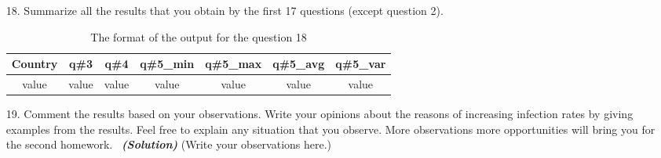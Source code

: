 \documentclass[a4 paper]{article}
\numberwithin{equation}{section}
\newcommand{\solution}{~\newline\textbf{\textit{(Solution)}} }
\newcommand{\0}{\mathbf{0}}
\begin{document}
\begin{itemize}
\begin{table}[ht]
\begin{tabular}{c c c c}
			\hline %
		\end{tabular}\label{table:nonlin}%
	\end{table}
	\item[18. ] Summarize all the results that you obtain by the first 17 questions (except question 2). 
	\begin{table}[ht]
		\caption{The format of the output for the question 18} %
		\centering  %
		\begin{tabular}{c c c c c c c}%
			\hline\hline       %
			Country & q\#3 & q\#4 & q\#5\_min &  q\#5\_max & q\#5\_avg &  q\#5\_var  \\ 
			[0.5ex]%
			\hline      %
			 value & value & value & value & value & value & value\\%

			\hline %
		\end{tabular}\label{table:nonlin}%
	\end{table}
	\item[19. ] Comment the results based on your observations. Write your opinions about the reasons of increasing infection rates by giving examples from the results. Feel free to explain any situation that you observe. More observations more opportunities will bring you for the second homework. 
	\solution (Write your observations here.)
	
	
	
\end{itemize}
\end{document}
